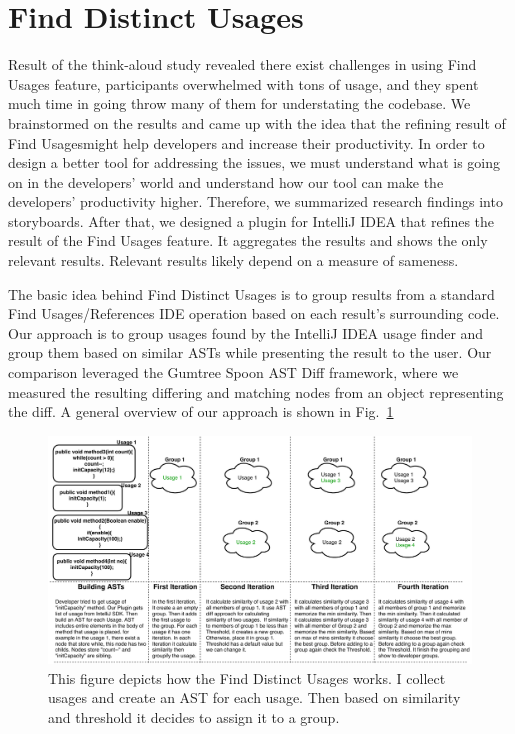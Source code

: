 \documentclass[conference]{IEEEtran}
\begin{document}
\section{Find Distinct Usages}
Result of the think-aloud study revealed there exist challenges in using Find Usages feature, participants overwhelmed with tons of usage, and they spent much time in going throw many of them for understating the codebase. We brainstormed on the results and came up with the idea that the refining result of Find Usagesmight help developers and increase their productivity. In order to design a better tool for addressing the issues, we must understand what is going on in the developers' world and understand how our tool can make the developers' productivity higher. Therefore, we summarized research findings into storyboards. After that, we designed a plugin for IntelliJ IDEA that refines the result of the Find Usages feature. It aggregates the results and shows the only relevant results. Relevant results likely depend on a measure of sameness.\par
The basic idea behind Find Distinct Usages is to group results from a standard Find Usages/References IDE operation based on each result's surrounding code. Our approach is to group usages found by the IntelliJ IDEA usage finder and group them based on similar ASTs while presenting the result to the user. Our comparison leveraged the Gumtree Spoon AST Diff framework, where we measured the resulting differing and matching nodes from an object representing the diff. A general overview of our approach is shown in Fig.~\ref{fig:general} 

\begin{figure}
    \centering
    \includegraphics [width=\textwidth,keepaspectratio,clip]{figures/generlView.pdf}
    \caption{This figure depicts how the Find Distinct Usages works. I collect usages and create an AST for each usage. Then based on similarity and threshold it decides to assign it to a group. }
\label{fig:general}
\end{figure}
\end{document}
